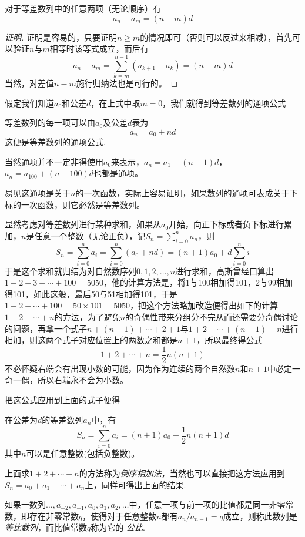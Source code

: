\begin{theorem}
对于等差数列中的任意两项（无论顺序）有
\[ a_n-a_m=(n-m)d \]
\end{theorem}

\begin{proof}[证明]
证明是容易的，只要证明$n\geqslant m$的情况即可（否则可以反过来相减），首先可以验证$n$与$m$相等时该等式成立，而后有
\[ a_n-a_m=\sum_{k=m}^{n-1}(a_{k+1}-a_k)=(n-m)d \]
当然，对差值$n-m$施行归纳法也是可行的。
\end{proof}

假定我们知道$a_0$和公差$d$，在上式中取$m=0$，我们就得到等差数列的通项公式
\begin{theorem}
  等差数列的每一项可以由$a_0$及公差$d$表为
\[ a_n=a_0+nd \]
这便是等差数列的通项公式.
\end{theorem}

当然通项并不一定非得使用$a_0$来表示，$a_n=a_1+(n-1)d$，$a_n=a_{100}+(n-100)d$也都是通项。

易见这通项是关于$n$的一次函数，实际上容易证明，如果数列的通项可表成关于下标的一次函数，则它必然是等差数列。

显然考虑对等差数列进行某种求和，如果从$a_0$开始，向正下标或者负下标进行累加，$n$是任意一个整数（无论正负），记$S_n=\sum_{i=0}^{n}a_n$，则
\[ S_n=\sum_{i=0}^na_i=\sum_{i=0}^n(a_0+nd)=(n+1)a_0+d\sum_{i=0}^ni\]
于是这个求和就归结为对自然数序列$0,1,2,\ldots,n$进行求和，高斯曾经口算出$1+2+3+\cdots+100=5050$，他的计算方法是，将1与100相加得101，2与99相加得101，如此这般，最后50与51相加得101，于是$1+2+\cdots+100=50 \times 101=5050$，把这个方法略加改造便得出如下的计算$1+2+\cdots+n$的方法，为了避免$n$的奇偶性带来分组分不完从而还需要分奇偶讨论的问题，再拿一个式子$n+(n-1)+\cdots+2+1$与$1+2+\cdots+(n-1)+n$进行相加，则这两个式子对应位置上的两数之和都是$n+1$，所以最终得公式
\[ 1+2+\cdots+n = \frac{1}{2}n(n+1) \]
不必怀疑右端会有出现小数的可能，因为作为连续的两个自然数$n$和$n+1$中必定一奇一偶，所以右端永不会为小数。

把这公式应用到上面的式子便得
\begin{theorem}
  在公差为$d$的等差数列$a_n$中，有
  \[ S_n=\sum_{i=0}^na_i=(n+1)a_0+\frac{1}{2}n(n+1)d \]
  其中$n$可以是任意整数(包括负整数)。
\end{theorem}

上面求$1+2+\cdots+n$的方法称为\emph{倒序相加法}，当然也可以直接把这方法应用到$S_n=a_0+a_1+\cdots+a_n$上，同样可得出上面的结果.

\begin{definition}
  如果一数列$\ldots,a_{-2},a_{-1},a_0,a_1,a_2,\ldots$中，任意一项与前一项的比值都是同一非零常数，即存在非零常数$q$，使得对于任意整数$n$都有$a_n / a_{n-1} = q$成立，则称此数列是 \emph{等比数列}，而比值常数$q$称为它的 \emph{公比}.
\end{definition}

